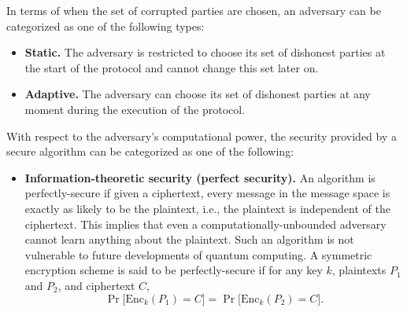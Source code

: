 \documentclass[10pt]{article}
\theoremstyle{plain}
\begin{document}
In terms of when the set of corrupted parties are chosen, an adversary
can be categorized as one of the following types:
\begin{itemize}
	\item \textbf{Static. }The adversary is restricted to choose its set of
	dishonest parties at the start of the protocol and cannot change this
	set later on.
	\item \textbf{Adaptive.} The adversary can choose its set of dishonest parties
	at any moment during the execution of the protocol.
\end{itemize}
With respect to the adversary's computational power, the security
provided by a secure algorithm can be categorized as one of the following:
\begin{itemize}
	\item \textbf{Information-theoretic security (perfect security).} An algorithm
	is perfectly-secure if given a ciphertext, every message in the message
	space is exactly as likely to be the plaintext, i.e., the plaintext
	is independent of the ciphertext. This implies that even a computationally-unbounded
	adversary cannot learn anything about the plaintext. Such an algorithm
	is not vulnerable to future developments of quantum computing. A symmetric
	encryption scheme is said to be perfectly-secure if for any key $k$,
	plaintexts $P_{1}$ and $P_{2}$, and ciphertext $C$,
	\[
	\Pr\big[\text{Enc}_{k}(P_{1})=C\big]=\Pr\big[\text{Enc}_{k}(P_{2})=C\big].
	\]
	

\end{itemize}
\end{document}

